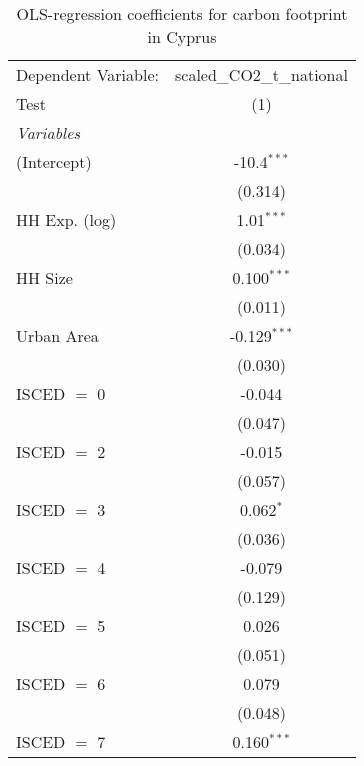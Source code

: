 
\begin{table}[htbp!]
   \centering
   \small
   \begin{adjustbox}{width = 1\textwidth, max height = 0.95\textheight, center}
      \begin{threeparttable}[b]
         \caption{\label{tab:OLS_2_CYP} OLS-regression coefficients for carbon footprint in Cyprus}
         \begin{tabular}{lc}
            \tabularnewline \midrule \midrule
            Dependent Variable: & scaled\_CO2\_t\_national\\     
            Test                & (1)\\  
            \midrule
            \emph{Variables}\\
            (Intercept)         & -10.4$^{***}$\\   
                                & (0.314)\\   
            HH Exp. (log)       & 1.01$^{***}$\\   
                                & (0.034)\\   
            HH Size             & 0.100$^{***}$\\   
                                & (0.011)\\   
            Urban Area          & -0.129$^{***}$\\   
                                & (0.030)\\   
            ISCED $=$ 0         & -0.044\\   
                                & (0.047)\\   
            ISCED $=$ 2         & -0.015\\   
                                & (0.057)\\   
            ISCED $=$ 3         & 0.062$^{*}$\\   
                                & (0.036)\\   
            ISCED $=$ 4         & -0.079\\   
                                & (0.129)\\   
            ISCED $=$ 5         & 0.026\\   
                                & (0.051)\\   
            ISCED $=$ 6         & 0.079\\   
                                & (0.048)\\   
            ISCED $=$ 7         & 0.160$^{***}$\\   

\end{tabular}
\end{threeparttable}
\end{adjustbox}
\end{table}
